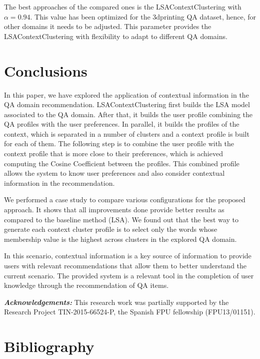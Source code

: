 \documentclass[preprint]{elsarticle}
\begin{document}
\begin{spacing}{1.5}
The best approaches of the compared ones is the LSAContextClustering with $\alpha=0.94$. This value has been optimized for the 3dprinting QA dataset, hence, for other domains it needs to be adjusted. This parameter provides the LSAContextClustering with flexibility to adapt to different QA domains.

\section{Conclusions}
\label{sec:conclusions}

In this paper, we have explored the application of contextual information in the QA domain recommendation. LSAContextClustering first builds the LSA model associated to the QA domain. After that, it builds the user profile combining the QA profiles with the user preferences. In parallel, it builds the profiles of the context, which is separated in a number of clusters and a context profile is built for each of them. The following step is to combine the user profile with the context profile that is more close to their preferences, which is achieved computing the Cosine Coefficient between the profiles. This combined profile allows the system to know user preferences and also consider contextual information in the recommendation. 

We performed a case study to compare various configurations for the proposed approach. It shows that all improvements done provide better results as compared to the baseline method (LSA). We found out that the best way to generate each context cluster profile is to select only the words whose membership value is the highest across clusters in the explored QA domain.

In this scenario, contextual information is a key source of information to provide users with relevant recommendations that allow them to better understand the current scenario. The provided system is a relevant tool in the completion of user knowledge through the recommendation of QA items.

\textbf{\textit{Acknowledgements:}} This research work was partially supported by the Research Project TIN-2015-66524-P, the Spanish FPU fellowship (FPU13/01151).

\section*{Bibliography}



\end{spacing}
\end{document}
